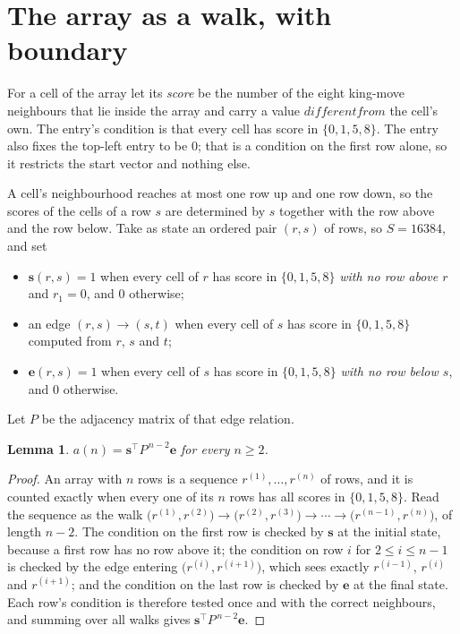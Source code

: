 \documentclass[11pt,a4paper]{article}
\theoremstyle{plain}
\newtheorem{lemma}[theorem]{Lemma}
\theoremstyle{definition}
\begin{document}
\section{The array as a walk, with boundary}

For a cell of the array let its \emph{score} be the number of the eight king-move neighbours that lie inside
the array and carry a value $different from$ the cell's own. The entry's condition is that every cell
has score in $\{0,1,5,8\}$. The entry also fixes the top-left entry to be $0$; that is a condition on the first row alone, so it restricts the start vector and nothing else.

A cell's neighbourhood reaches at most one row up and one row down, so the scores of the
cells of a row $s$ are determined by $s$ together with the row above and the row below.
Take as state an ordered pair $(r,s)$ of rows, so $S=16384$, and set
\begin{itemize}
\item $\mathbf{s}(r,s)=1$ when every cell of $r$ has score in $\{0,1,5,8\}$ \emph{with no row
above $r$} and $r_1=0$, and $0$ otherwise;
\item an edge $(r,s)\to(s,t)$ when every cell of $s$ has score in $\{0,1,5,8\}$ computed from
$r$, $s$ and $t$;
\item $\mathbf{e}(r,s)=1$ when every cell of $s$ has score in $\{0,1,5,8\}$ \emph{with no row
below $s$}, and $0$ otherwise.
\end{itemize}
Let $P$ be the adjacency matrix of that edge relation.

\begin{lemma}\label{lem:walk}
$a(n)=\mathbf{s}^{\!\top}P^{\,n-2}\mathbf{e}$ for every $n\ge2$.
\end{lemma}

\begin{proof}
An array with $n$ rows is a sequence $r^{(1)},\dots,r^{(n)}$ of rows, and it is counted
exactly when every one of its $n$ rows has all scores in $\{0,1,5,8\}$. Read the sequence as the
walk $\bigl(r^{(1)},r^{(2)}\bigr)\to\bigl(r^{(2)},r^{(3)}\bigr)\to\cdots\to
\bigl(r^{(n-1)},r^{(n)}\bigr)$, of length $n-2$. The condition on the first row is
checked by $\mathbf{s}$ at the initial state, because a first row has no row above it; the
condition on row $i$ for $2\le i\le n-1$ is checked by the edge entering
$\bigl(r^{(i)},r^{(i+1)}\bigr)$, which sees exactly $r^{(i-1)}$, $r^{(i)}$ and
$r^{(i+1)}$; and the condition on the last row is checked by $\mathbf{e}$ at the final
state. Each row's condition is therefore tested once and with the correct neighbours, and
summing over all walks gives $\mathbf{s}^{\!\top}P^{\,n-2}\mathbf{e}$.
\end{proof}
\end{document}
